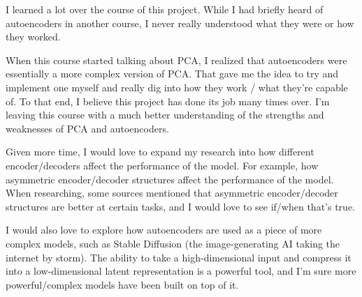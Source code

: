\documentclass[11pt]{article}
\begin{document}
I learned a lot over the course of this project. While I had briefly
heard of autoencoders in another course, I never really understood what
they were or how they worked.

When this course started talking about PCA, I realized that autoencoders
were essentially a more complex version of PCA. That gave me the idea to
try and implement one myself and really dig into how they work / what
they're capable of. To that end, I believe this project has done its job
many times over. I'm leaving this course with a much better
understanding of the strengths and weaknesses of PCA and autoencoders.

Given more time, I would love to expand my research into how different
encoder/decoders affect the performance of the model. For example, how
asymmetric encoder/decoder structures affect the performance of the
model. When researching, some sources mentioned that asymmetric
encoder/decoder structures are better at certain tasks, and I would love
to see if/when that's true.

I would also love to explore how autoencoders are used as a piece of
more complex models, such as Stable Diffusion (the image-generating AI
taking the internet by storm). The ability to take a high-dimensional
input and compress it into a low-dimensional latent representation is a
powerful tool, and I'm sure more powerful/complex models have been built
on top of it.


\end{document}
